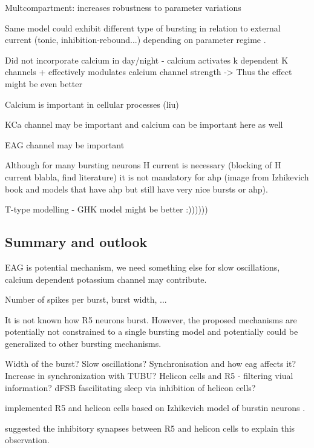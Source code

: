 \documentclass[../main.tex]{subfiles}
\begin{document}
Multcompartment: increases robustness to parameter variations

Same model could exhibit different type of bursting in relation to external current (tonic, inhibition-rebound...) depending on parameter regime \parencite{parkMathematicalModelSubthalamic2021}.



Did not incorporate calcium in day/night - calcium activates k dependent K channels + effectively modulates calcium channel strength -> Thus the effect might be even better

Calcium is important in cellular processes (liu)

KCa channel may be important and calcium can be important here as well

EAG channel may be important

Although for many bursting neurons H current is necessary (blocking of H current blabla, find literature)
it is not mandatory for \gls{ahp} (image from Izhikevich book and models that have ahp but still
have very nice bursts or ahp).

T-type modelling - GHK model might be better :))))))

\subsection{Summary and outlook}

EAG is potential mechanism, we need something else for slow oscillations, calcium dependent potassium channel may contribute.

Number of spikes per burst, burst width, ...

It is not known how R5 neurons burst. However, the proposed mechanisms are potentially not constrained to a single bursting model and potentially could be generalized to other bursting mechanisms.

Width of the burst? Slow oscillations? Synchronisation and how eag affects it? Increase in synchronization with TUBU? Helicon cells and R5 - filtering viual information? dFSB fascilitating sleep via inhibition of helicon cells?

\parencite{krummSlowlyOscillatingBrain2021} implemented R5 and helicon cells based
on Izhikevich model of burstin neurons \parencite{izhikevichSimpleModelSpiking2003}.

\parencite{krummSlowlyOscillatingBrain2021} suggested the inhibitory synapses between R5 and
helicon cells to explain this observation.
\end{document}
